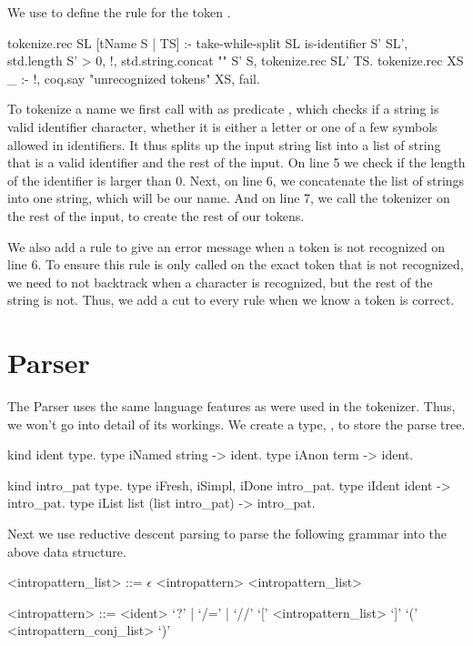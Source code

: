 \documentclass[thesis.tex]{subfiles}
\begin{document}
{{We use  to define the rule for the token .
\begin{elpicode}
  tokenize.rec SL [tName S | TS] :-
    take-while-split SL is-identifier S' SL',
    { std.length S' } > 0, !,
    std.string.concat "" S' S,
    tokenize.rec SL' TS.
  tokenize.rec XS _ :- !, 
    coq.say "unrecognized tokens" XS, fail.  
\end{elpicode}
To tokenize a name we first call  with as predicate , which checks if a string is valid identifier character, whether it is either a letter or one of a few symbols allowed in identifiers. It thus splits up the input string list into a list of string that is a valid identifier and the rest of the input. On line 5 we check if the length of the identifier is larger than 0. Next, on line 6, we concatenate the list of strings into one string, which will be our name. And on line 7, we call the tokenizer on the rest of the input, to create the rest of our tokens.

We also add a rule to give an error message when a token is not recognized on line 6. To ensure this rule is only called on the exact token that is not recognized, we need to not backtrack when a character is recognized, but the rest of the string is not. Thus, we add a cut to every rule when we know a token is correct.

\section{Parser}\label{ssec:parser}
The Parser uses the same language features as were used in the tokenizer. Thus, we won't go into detail of its workings. We create a type, , to store the parse tree.
\begin{elpicode}
  kind ident type.
  type iNamed string -> ident.
  type iAnon term -> ident.

  kind intro_pat type.
  type iFresh, iSimpl, iDone intro_pat.
  type iIdent ident -> intro_pat.
  type iList list (list intro_pat) -> intro_pat.
\end{elpicode}
Next we use reductive descent parsing to parse the following grammar into the above data structure.
\begin{grammar}
  <intropattern\_list> ::= $\epsilon$
  \alt <intropattern> <intropattern\_list>

  <intropattern> ::= <ident>
  \alt `?' | `/=' | `//'
  \alt `[' <intropattern\_list> `]'
  \alt `(' <intropattern\_conj\_list> `)'


\end{grammar}}}
\end{document}
